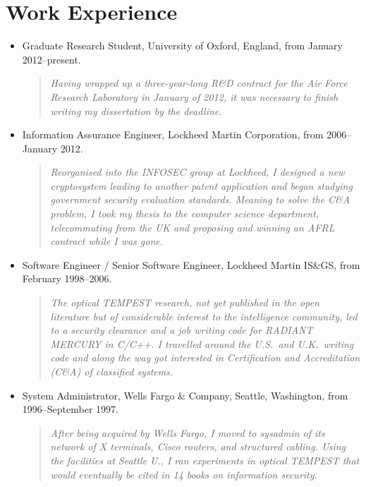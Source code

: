 \documentclass[letterpaper]{article}
\begin{document}
\section*{Work Experience}

\begin{itemize}
	\item Graduate Research Student, University of Oxford, England, from January 2012--present.
		\begin{quote}\vspace{-2mm}
			\emph{Having wrapped up a three-year-long R\&D contract for the Air Force Research
			Laboratory in January of 2012, it was necessary to finish writing my dissertation by
			the deadline.}
		\end{quote}

	\item Information Assurance Engineer, Lockheed Martin Corporation, from 2006--January 2012.
		\begin{quote}\vspace{-2mm}
			\emph{Reorganised into the INFOSEC group at Lockheed, I designed a new
			cryptosystem leading to another patent application and began studying
			government security evaluation standards.  Meaning to solve the C\&A problem,
			I took my thesis to the computer science department, telecommuting from the UK and
			proposing and winning an AFRL contract while I was gone.}
		\end{quote}

	\item Software Engineer / Senior Software Engineer, Lockheed Martin IS\&GS, from
		February 1998--2006.
		\begin{quote}\vspace{-2mm}
			\emph{The optical TEMPEST research, not yet published in the open literature but
			of considerable interest to the intelligence community, led to a security clearance
			and a job writing code for RADIANT MERCURY in C/C++.  I travelled around the
			U.S.\ and U.K.\ writing code and along the way got interested in Certification and
			Accreditation (C\&A) of classified systems.}
		\end{quote}

	\item System Administrator, Wells Fargo \& Company, Seattle, Washington,
		from 1996--September 1997.
		\begin{quote}\vspace{-2mm}
			\emph{After being acquired by Wells Fargo, I moved to sysadmin of its network
			of X terminals, Cisco routers, and structured cabling.  Using the facilities
			at Seattle U., I ran experiments in optical TEMPEST that would eventually
			be cited in 14 books on information security.}
		\end{quote}


\end{itemize}
\end{document}
